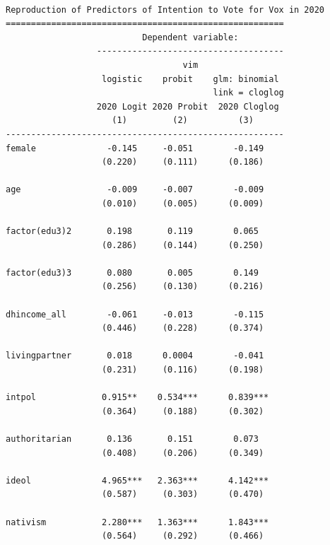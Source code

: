 \documentclass[
  letterpaper,
  DIV=11,
  numbers=noendperiod]{scrartcl}
\begin{document}
\begin{verbatim}

Reproduction of Predictors of Intention to Vote for Vox in 2020
=======================================================
                           Dependent variable:         
                  -------------------------------------
                                   vim                 
                   logistic    probit    glm: binomial 
                                         link = cloglog
                  2020 Logit 2020 Probit  2020 Cloglog 
                     (1)         (2)          (3)      
-------------------------------------------------------
female              -0.145     -0.051        -0.149    
                   (0.220)     (0.111)      (0.186)    
                                                       
age                 -0.009     -0.007        -0.009    
                   (0.010)     (0.005)      (0.009)    
                                                       
factor(edu3)2       0.198       0.119        0.065     
                   (0.286)     (0.144)      (0.250)    
                                                       
factor(edu3)3       0.080       0.005        0.149     
                   (0.256)     (0.130)      (0.216)    
                                                       
dhincome_all        -0.061     -0.013        -0.115    
                   (0.446)     (0.228)      (0.374)    
                                                       
livingpartner       0.018      0.0004        -0.041    
                   (0.231)     (0.116)      (0.198)    
                                                       
intpol             0.915**    0.534***      0.839***   
                   (0.364)     (0.188)      (0.302)    
                                                       
authoritarian       0.136       0.151        0.073     
                   (0.408)     (0.206)      (0.349)    
                                                       
ideol              4.965***   2.363***      4.142***   
                   (0.587)     (0.303)      (0.470)    
                                                       
nativism           2.280***   1.363***      1.843***   
                   (0.564)     (0.292)      (0.466)    
                                                       

\end{verbatim}
\end{document}
